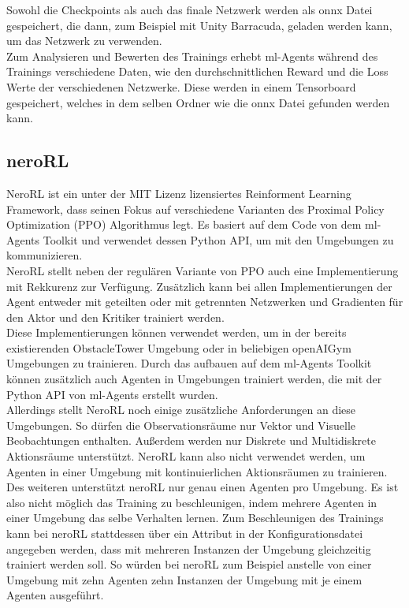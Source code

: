 \noindent Sowohl die Checkpoints als auch das finale Netzwerk werden als onnx Datei gespeichert, die dann, zum Beispiel mit Unity Barracuda, geladen werden kann, um das Netzwerk zu verwenden.\\
Zum Analysieren und Bewerten des Trainings erhebt ml-Agents während des Trainings verschiedene Daten, wie den durchschnittlichen Reward und die Loss Werte der verschiedenen Netzwerke. Diese werden in einem Tensorboard gespeichert, welches in dem selben Ordner wie die onnx Datei gefunden werden kann. 

\subsection{neroRL}\label{neroRLFramework}

NeroRL ist ein unter der MIT Lizenz lizensiertes Reinforment Learning Framework, dass seinen Fokus auf verschiedene Varianten des Proximal Policy Optimization (PPO) Algorithmus legt. Es basiert auf dem Code von dem ml-Agents Toolkit und verwendet dessen Python API, um mit den Umgebungen zu kommunizieren. \\
NeroRL stellt neben der regulären Variante von PPO auch eine Implementierung mit Rekkurenz zur Verfügung. Zusätzlich kann bei allen Implementierungen der Agent entweder mit geteilten oder mit getrennten Netzwerken und Gradienten für den Aktor und den Kritiker trainiert werden. \\
Diese Implementierungen können verwendet werden, um in der bereits existierenden ObstacleTower Umgebung oder in beliebigen openAIGym Umgebungen zu trainieren. Durch das aufbauen auf dem ml-Agents Toolkit können zusätzlich auch Agenten in Umgebungen trainiert werden, die mit der Python API von ml-Agents erstellt wurden.\\
Allerdings stellt NeroRL noch einige zusätzliche Anforderungen an diese Umgebungen. So dürfen die Observationsräume nur Vektor und Visuelle Beobachtungen enthalten. Außerdem werden nur Diskrete und Multidiskrete Aktionsräume unterstützt. NeroRL kann also nicht verwendet werden, um Agenten in einer Umgebung mit kontinuierlichen Aktionsräumen zu trainieren.
Des weiteren unterstützt neroRL nur genau einen Agenten pro Umgebung. Es ist also nicht möglich das Training zu beschleunigen, indem mehrere Agenten in einer Umgebung das selbe Verhalten lernen. Zum Beschleunigen des Trainings kann bei neroRL stattdessen über ein Attribut in der Konfigurationsdatei angegeben werden, dass mit mehreren Instanzen der Umgebung gleichzeitig trainiert werden soll. So würden bei neroRL zum Beispiel anstelle von einer Umgebung mit zehn Agenten zehn Instanzen der Umgebung mit je einem Agenten ausgeführt.\\

